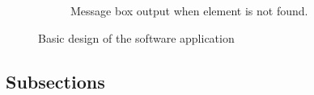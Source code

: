 \documentclass[12pt,a4paper]{article}
\begin{document}
\begin{figure}[H]
\begin{subfigure}[b]{0.45\linewidth}
            \caption{Message box output when element is not found.}
            \label{fig:sub2}
        \end{subfigure}
        \caption{Basic design of the software application}
        \label{fig:overall}
    \end{figure}
\subsection{Subsections}
\end{document}
